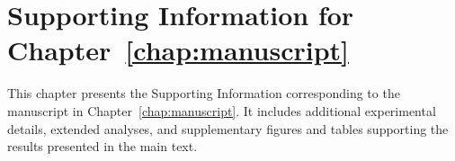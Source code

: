 \chapter{Supporting Information for Chapter~\ref{chap:manuscript}}
\label{chap:supporting}
This chapter presents the Supporting Information corresponding to the manuscript in Chapter~\ref{chap:manuscript}. 
It includes additional experimental details, extended analyses, and supplementary figures and tables supporting the results presented in the main text.

